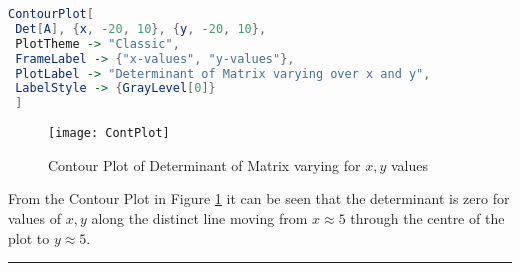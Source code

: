 \documentclass[12pt]{article}
\begin{document}
\begin{lstlisting}[language = Mathematica]
ContourPlot[
 Det[A], {x, -20, 10}, {y, -20, 10},
 PlotTheme -> "Classic",
 FrameLabel -> {"x-values", "y-values"},
 PlotLabel -> "Determinant of Matrix varying over x and y",
 LabelStyle -> {GrayLevel[0]}
 ]
\end{lstlisting}	
\begin{figure}[h]
	\centering
	\texttt{[image: ContPlot]}
	\caption{Contour Plot of Determinant of Matrix varying for $x, y$ values}
	\label{fig:contplot}
\end{figure}



From the Contour Plot in Figure \ref{fig:contplot} it can be seen that the determinant is zero for values of $x,y$ along the distinct line moving from $x \approx 5$ through the centre of the plot to $y \approx 5$.



\begin{flushright}
{\rule{0.7em}{0.7em}}
\end{flushright}
 
\end{document}
